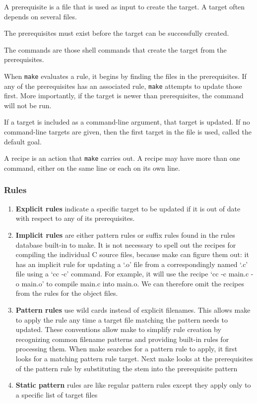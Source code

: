 A prerequisite is a file that is used as input to create the target.
A target often depends on several files.

The prerequisites must exist before the target can be successfully created.

The commands are those shell commands that create the target from the prerequisites.

When \texttt{make} evaluates a rule, it begins by finding the files in the prerequisites.
If any of the prerequisites has an associated rule, \texttt{make} attempts to update those first.
More importantly, if the target is newer than prerequisites, the command will not be run.

If a target is included as a command-line argument, that target is updated.
If no command-line targets are given, then the first target in the file is used, called the default goal.

A recipe is an action that \texttt{make} carries out. A recipe may have more than one command, either on the same line or each on its own line.

\subsubsection{Rules}%
\label{ssub:rules}

\begin{enumerate}
  \item \textbf{Explicit rules} indicate a specific target to be updated if it is out of date with respect to any of its prerequisites.
  \item \textbf{Implicit rules} are either pattern rules or suffix rules found in the rules database built-in to make.
    It is not necessary to spell out the recipes for compiling the individual C source files, because make can figure them out: it has an implicit rule for updating a ‘.o’ file from a correspondingly named ‘.c’ file using a ‘cc -c’ command. For example, it will use the recipe ‘cc -c main.c -o main.o’ to compile main.c into main.o. We can therefore omit the recipes from the rules for the object files.
  \item \textbf{Pattern rules} use wild cards instead of explicit filenames. This allows make to apply the rule any time a target file matching the pattern needs to updated.  These conventions allow make to simplify rule creation by recognizing common filename patterns and providing built-in rules for processing them. When make searches for a pattern rule to apply, it first looks for a matching pattern rule target. Next make looks at the prerequisites of the pattern rule by substituting the stem into the prerequisite pattern
  \item \textbf{Static pattern} rules are like regular pattern rules except they apply only to a specific list of target files
\end{enumerate}

